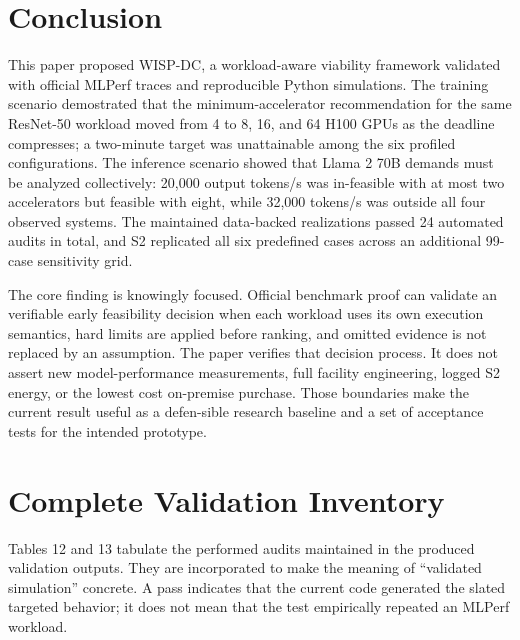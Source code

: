 \documentclass[final,3p,12pt,nopreprintline]{elsarticle}
\begin{document}
\section{Conclusion}


This paper proposed WISP-DC, a workload-aware viability framework validated with official MLPerf traces and reproducible Python simulations. The training scenario demostrated that the minimum-accelerator recommendation for the same ResNet-50 workload moved from 4 to 8, 16, and 64 H100 GPUs as the deadline compresses; a two-minute target was unattainable among the six profiled configurations. The inference scenario showed that Llama 2 70B demands must be analyzed collectively: 20,000 output tokens/s was in-feasible with at most two accelerators but feasible with eight, while 32,000 tokens/s was outside all four observed systems. The maintained data-backed realizations passed 24 automated audits in total, and S2 replicated all six predefined cases across an additional 99-case sensitivity grid.


The core finding is knowingly focused. Official benchmark proof can validate an verifiable early feasibility decision when each workload uses its own execution semantics, hard limits are applied before ranking, and omitted evidence is not replaced by an assumption. The paper verifies that decision process. It does not assert new model-performance measurements, full facility engineering, logged S2 energy, or the lowest cost on-premise purchase. Those boundaries make the current result useful as a defen-sible research baseline and a set of acceptance tests for the intended prototype.


\appendix
\setcounter{equation}{9}
\renewcommand{\theequation}{\arabic{equation}}
\renewcommand{\thetable}{\arabic{table}}
\renewcommand{\thefigure}{\arabic{figure}}

\section{Complete Validation Inventory}


Tables 12 and 13 tabulate the performed audits maintained in the produced validation outputs. They are incorporated to make the meaning of “validated simulation” concrete. A pass indicates that the current code generated the slated targeted behavior; it does not mean that the test empirically repeated an MLPerf workload.
\end{document}
